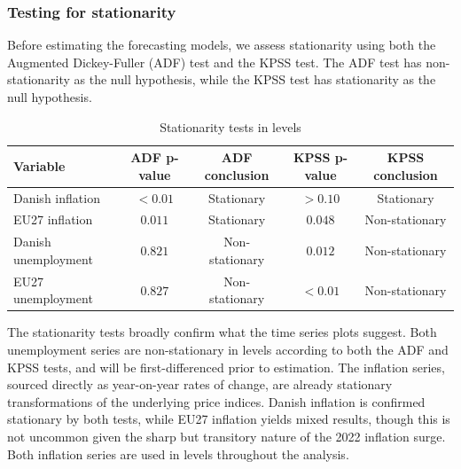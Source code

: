 \subsubsection{Testing for stationarity}

Before estimating the forecasting models, we assess stationarity using both the Augmented Dickey-Fuller (ADF) test and the KPSS test. The ADF test has non-stationarity as the null hypothesis, while the KPSS test has stationarity as the null hypothesis.


\begin{table}[H]
\centering
\caption{Stationarity tests in levels}
\begin{tabular}{lcccc}
\hline
Variable & ADF p-value & ADF conclusion & KPSS p-value & KPSS conclusion \\
\hline
Danish inflation      & $<0.01$ & Stationary     & $>0.10$ & Stationary     \\
EU27 inflation        & $0.011$ & Stationary     & $0.048$ & Non-stationary \\
Danish unemployment   & $0.821$ & Non-stationary & $0.012$ & Non-stationary \\
EU27 unemployment     & $0.827$ & Non-stationary & $<0.01$ & Non-stationary \\
\hline
\end{tabular}
\label{tab:stationarity_levels}
\end{table}

The stationarity tests broadly confirm what the time series plots suggest. Both unemployment 
series are non-stationary in levels according to both the ADF and KPSS tests, and will be 
first-differenced prior to estimation. The inflation series, sourced directly as year-on-year 
rates of change, are already stationary transformations of the underlying price indices. 
Danish inflation is confirmed stationary by both tests, while EU27 inflation yields mixed 
results, though this is not uncommon given the sharp but transitory nature of the 2022 
inflation surge. Both inflation series are used in levels throughout the analysis.



